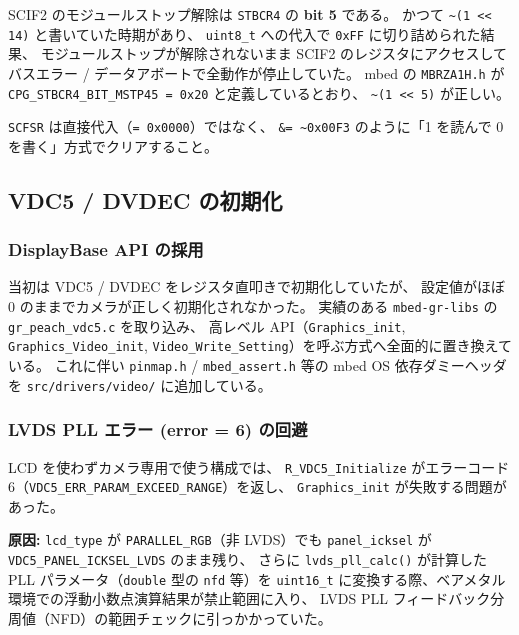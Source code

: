 \documentclass[a4paper,11pt,dvipdfmx]{jsarticle}
\begin{document}
\begin{cautionbox}
SCIF2 のモジュールストップ解除は \texttt{STBCR4} の \textbf{bit 5} である。
かつて \texttt{\textasciitilde(1 << 14)} と書いていた時期があり、
\texttt{uint8\_t} への代入で \texttt{0xFF} に切り詰められた結果、
モジュールストップが解除されないまま SCIF2 のレジスタにアクセスして
バスエラー / データアボートで全動作が停止していた。
mbed の \texttt{MBRZA1H.h} が \texttt{CPG\_STBCR4\_BIT\_MSTP45 = 0x20} と定義しているとおり、
\texttt{\textasciitilde(1 << 5)} が正しい。
\end{cautionbox}

\begin{notebox}
\texttt{SCFSR} は直接代入（\texttt{= 0x0000}）ではなく、
\texttt{\&= \textasciitilde0x00F3} のように「1 を読んで 0 を書く」方式でクリアすること。
\end{notebox}

\subsection{VDC5 / DVDEC の初期化}\label{sec:vdc5}

\subsubsection{DisplayBase API の採用}

当初は VDC5 / DVDEC をレジスタ直叩きで初期化していたが、
設定値がほぼ 0 のままでカメラが正しく初期化されなかった。
実績のある \texttt{mbed-gr-libs} の \texttt{gr\_peach\_vdc5.c} を取り込み、
高レベル API（\texttt{Graphics\_init}, \texttt{Graphics\_Video\_init},
\texttt{Video\_Write\_Setting}）を呼ぶ方式へ全面的に置き換えている。
これに伴い \texttt{pinmap.h} / \texttt{mbed\_assert.h} 等の
mbed OS 依存ダミーヘッダを \texttt{src/drivers/video/} に追加している。

\subsubsection{LVDS PLL エラー (error = 6) の回避}

LCD を使わずカメラ専用で使う構成では、
\texttt{R\_VDC5\_Initialize} がエラーコード 6（\texttt{VDC5\_ERR\_PARAM\_EXCEED\_RANGE}）を返し、
\texttt{Graphics\_init} が失敗する問題があった。

\textbf{原因:} \texttt{lcd\_type} が \texttt{PARALLEL\_RGB}（非 LVDS）でも
\texttt{panel\_icksel} が \texttt{VDC5\_PANEL\_ICKSEL\_LVDS} のまま残り、
さらに \texttt{lvds\_pll\_calc()} が計算した PLL パラメータ（\texttt{double} 型の \texttt{nfd} 等）を
\texttt{uint16\_t} に変換する際、ベアメタル環境での浮動小数点演算結果が禁止範囲に入り、
LVDS PLL フィードバック分周値（NFD）の範囲チェックに引っかかっていた。
\end{document}
